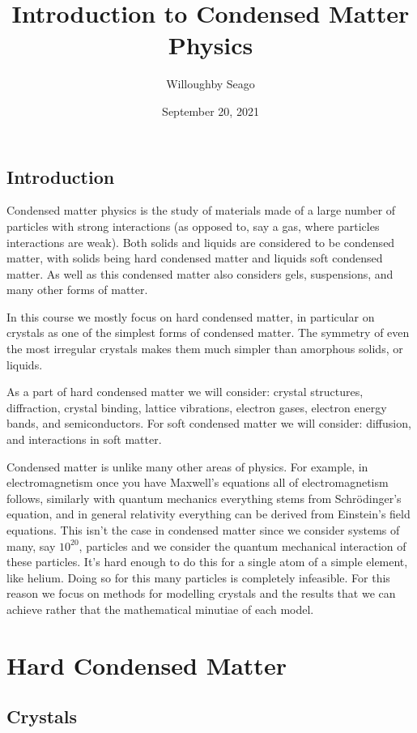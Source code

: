 \documentclass[fleqn]{NotesClass}
\title{Introduction to Condensed Matter Physics}
\author{Willoughby Seago}
\date{September 20, 2021}
\begin{document}
    \frontmatter
    \titlepage
    \tableofcontents
    \mainmatter
    
    \chapter{Introduction}
    Condensed matter physics is the study of materials made of a large number of particles with strong interactions (as opposed to, say a gas, where particles interactions are weak).
    Both solids and liquids are considered to be condensed matter, with solids being hard condensed matter and liquids soft condensed matter.
    As well as this condensed matter also considers gels, suspensions, and many other forms of matter.
    
    In this course we mostly focus on hard condensed matter, in particular on crystals as one of the simplest forms of condensed matter.
    The symmetry of even the most irregular crystals makes them much simpler than amorphous solids, or liquids.
    
    As a part of hard condensed matter we will consider: crystal structures, diffraction, crystal binding, lattice vibrations, electron gases, electron energy bands, and semiconductors.
    For soft condensed matter we will consider: diffusion, and interactions in soft matter.
    
    Condensed matter is unlike many other areas of physics.
    For example, in electromagnetism once you have Maxwell's equations all of electromagnetism follows, similarly with quantum mechanics everything stems from Schr\"odinger's equation, and in general relativity everything can be derived from Einstein's field equations.
    This isn't the case in condensed matter since we consider systems of many, say \(10^{20}\), particles and we consider the quantum mechanical interaction of these particles.
    It's hard enough to do this for a single atom of a simple element, like helium.
    Doing so for this many particles is completely infeasible.
    For this reason we focus on methods for modelling crystals and the results that we can achieve rather that the mathematical minutiae of each model.
    
    \part{Hard Condensed Matter}
    \chapter{Crystals}
\end{document}
